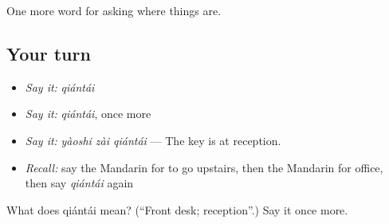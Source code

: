 \begin{grammarlens}[title={What you've built}]
One more word for asking where things are.
\end{grammarlens}

\subsection*{Your turn}
\begin{itemize}
\raggedright
  \item \emph{Say it:} \emph{qiántái}
  \item \emph{Say it:} \emph{qiántái}, once more
  \item \emph{Say it:} \emph{yàoshi zài qiántái} — The key is at reception.
  \item \emph{Recall:} say the Mandarin for to go upstairs, then the Mandarin for office, then say \emph{qiántái} again
\end{itemize}

\begin{tcolorbox}[breakable,colback=teal!4,colframe=teal!35!black,title={Before you move on}]
What does qiántái mean? (\textquotedblleft{}Front desk; reception\textquotedblright{}.) Say it once more.
\end{tcolorbox}
